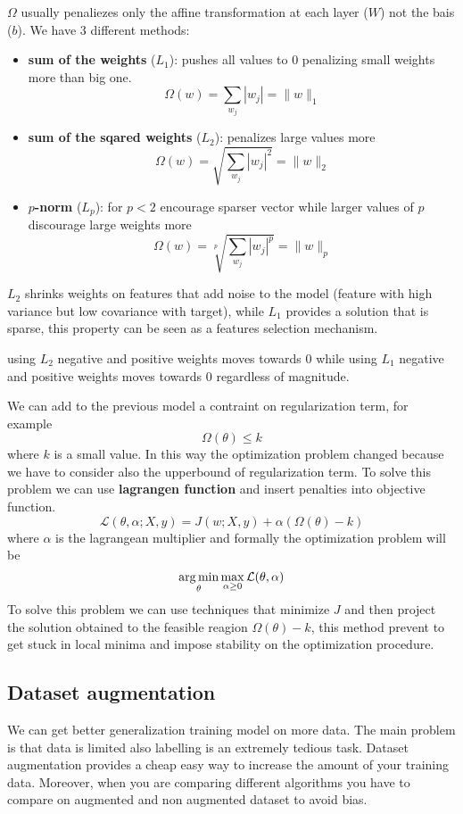 $\Omega$ usually penaliezes only the affine transformation at each layer ($W$) not the 
bais ($b$). We have $3$ different methods:
\begin{itemize}
    \item \textbf{sum of the weights} ($L_1$): pushes all values to $0$ penalizing 
    small weights more than big one.
    $$\Omega(w) = \sum_{w_j}|w_j|= \|w\|_1$$
    \item \textbf{sum of the sqared weights} ($L_2$): penalizes large values more
    $$\Omega(w) = \sqrt{\sum_{w_j}|w_j|^2} = \|w\|_2$$
    \item \textbf{$p$-norm} ($L_p$): for $p<2$ encourage sparser vector while larger 
    values of $p$ discourage large weights more
    $$\Omega(w) = \sqrt[p]{\sum_{w_j}|w_j|^p} = \|w\|_p$$
\end{itemize}

$L_2$ shrinks weights on features that add noise to the model (feature with high variance 
but low covariance with target), while $L_1$ provides a solution that is sparse,
this property can be seen as a features selection mechanism.

\begin{note}
    using $L_2$ negative and positive weights moves towards 0 while using $L_1$ 
    negative and positive weights moves towards 0 regardless of magnitude.  
\end{note}

We can add to the previous model a contraint on regularization term, for example 
$$\Omega(\theta) \le k$$
where $k$ is a small value. In this way the optimization problem changed because 
we have to consider also the upperbound of regularization term. To solve this problem
we can use \textbf{lagrangen function} and insert penalties into objective 
function.
$$\mathcal{L}(\theta, \alpha; X,y) = J(w;X,y)+ \alpha(\Omega(\theta)-k) $$
where $\alpha$ is the lagrangean multiplier and formally the optimization problem 
will be 
$$\operatorname*{arg\,min}_\theta \max_{\alpha \ge 0} \mathcal{L}(\theta, \alpha)$$ 
To solve this problem we can use techniques that minimize $J$ and then project 
the solution obtained to the feasible reagion $\Omega(\theta) -k$, this method prevent 
to get stuck in local minima and impose stability on the optimization procedure.

\subsection{Dataset augmentation}
We can get better generalization training model on more data. The main problem is 
that data is limited also labelling is an extremely tedious task. Dataset 
augmentation provides a cheap easy way to increase the amount of your training data.
Moreover, when you are comparing different algorithms you have to compare on
augmented and non augmented dataset to avoid bias.

